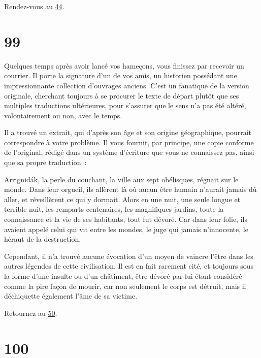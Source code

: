 \documentclass{report}
\newcommand{\gsection}[1]{
    \section{#1}
    \label{section-#1}
}
\newcommand{\glink}[1]{\hyperref[section-#1]{#1}}
\begin{document}
Rendez-vous au \glink{44}.

\gsection{99}

Quelques temps après avoir lancé vos hameçons, vous finissez par recevoir un courrier. Il porte la signature d'un de vos amis, un historien possédant une impressionnante collection d'ouvrages anciens. C'est un fanatique de la version originale, cherchant toujours à se procurer le texte de départ plutôt que ses multiples traductions ultérieures, pour s'assurer que le sens n'a pas été altéré, volontairement ou non, avec le temps.

Il a trouvé un extrait, qui d'après son âge et son origine géographique, pourrait correspondre à votre problème. Il vous fournit, par principe, une copie conforme de l'original, rédigé dans un système d'écriture que vous ne connaissez pas, ainsi que sa propre traduction :

Arrignidák, la perle du couchant, la ville aux sept obélisques, régnait sur le monde. Dans leur orgueil, ils allèrent là où aucun être humain n'aurait jamais dû aller, et réveillèrent ce qui y dormait. Alors en une nuit,  une seule longue et terrible nuit, les remparts centenaires, les magnifiques jardins, toute la connaissance et la vie de ses habitants, tout fut dévoré. Car dans leur folie, ils avaient appelé celui qui vit entre les mondes, le juge qui jamais n'innocente, le héraut de la destruction.

Cependant, il n'a trouvé aucune évocation d'un moyen de vaincre l'être dans les autres légendes de cette civilisation. Il est en fait rarement cité, et toujours sous la forme d'une insulte ou d'un châtiment, être dévoré par lui étant considéré comme la pire façon de mourir, car non seulement le corps est détruit, mais il déchiquette également l'âme de sa victime.

Retournez au \glink{50}.

\gsection{100}
\end{document}
